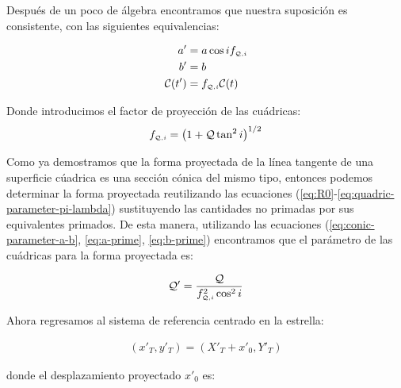 Después de un poco de álgebra encontramos que nuestra suposición es consistente, con las siguientes equivalencias:

\begin{align}
  a' &= a\cos i f_{\scriptscriptstyle \mathcal{Q}, i} \label{eq:a-prime}\\
  b' &= b \label{eq:b-prime}\\
  \mathcal{C}(t') &= f_{\scriptscriptstyle \mathcal{Q}, i} \mathcal{C}(t)
\end{align}

Donde introducimos el factor de proyección de las cuádricas:
\begin{align}
  f_{\scriptscriptstyle \mathcal{Q}, i} = \left(1 + \mathcal{Q}\tan^2i\right)^{1/2} \label{eq:Q-factor}
\end{align}


Como ya demostramos que la forma proyectada de la línea tangente de una superficie cúadrica es una sección cónica del mismo tipo, entonces podemos determinar la forma proyectada reutilizando las ecuaciones (\ref{eq:R0}-\ref{eq:quadric-parameter-pi-lambda}) sustituyendo las cantidades no primadas por sus equivalentes primados. De esta manera, utilizando las ecuaciones (\ref{eq:conic-parameter-a-b}, \ref{eq:a-prime}, \ref{eq:b-prime}) encontramos que el parámetro de las cuádricas para la forma proyectada es:

\begin{align}
  \mathcal{Q}' = \frac{\mathcal{Q}}{f_{\scriptscriptstyle \mathcal{Q}, i}^2 \cos^2 i}\label{eq:Q-prime}
\end{align}

Ahora regresamos al sistema de referencia centrado en la estrella:

\begin{align}
  (x'_T, y'_T) = (X'_T + x'_0, Y'_T)
\end{align}

donde el desplazamiento proyectado $x'_0$ es:


